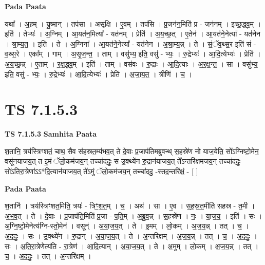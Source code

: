 \documentclass[17pt]{extarticle}
\begin{document}
\textbf{Pada Paata} \newline

यथा᳚ । अ॒हम् । यु॒ष्मान् । तप॑सा । असृ॑क्षि । ए॒वम् । तप॑सि । प्र॒जन॑न॒मिति॑ प्र - जन॑नम् । इ॒च्छ॒द्ध्व॒म् । इति॑ । तेभ्यः॑ । अ॒ग्निम् । आ॒यत॑न॒मित्या᳚ - यत॑नम् । प्रेति॑ । अ॒य॒च्छ॒त् । ए॒तेन॑ । आ॒यत॑ने॒नेत्या᳚ - यत॑नेन । श्रा॒म्य॒त॒ । इति॑ । ते । अ॒ग्निना᳚ । आ॒यत॑ने॒नेत्या᳚ - यत॑नेन । अ॒श्रा॒म्य॒न्न् । ते । सं॒ॅव॒थ्स॒र इति॑ सं - व॒थ्स॒रे । एका᳚म् । गाम् । अ॒सृ॒ज॒न्त॒ । ताम् । वसु॑भ्य॒ इति॒ वसु॑ - भ्यः॒ । रु॒द्रेभ्यः॑ । आ॒दि॒त्येभ्यः॑ । प्रेति॑ । अ॒य॒च्छ॒न्न् । ए॒ताम् । र॒क्ष॒द्ध्व॒म् । इति॑ । ताम् । वस॑वः । रु॒द्राः । आ॒दि॒त्याः । अ॒र॒क्ष॒न्त॒ । सा । वसु॑भ्य॒ इति॒ वसु॑ - भ्यः॒ । रु॒द्रेभ्यः॑ । आ॒दि॒त्येभ्यः॑ । प्रेति॑ । अ॒जा॒य॒त॒ । त्रीणि॑ । च॒ ।  \newline




\section*{ TS 7.1.5.3 }

\textbf{TS 7.1.5.3 } \newline
\textbf{Samhita Paata} \newline

श॒तानि॒ त्रय॑स्त्रिꣳशतं॒ चाथ॒ सैव स॑हस्रत॒म्य॑भव॒त् ते दे॒वाः प्र॒जाप॑तिमब्रुवन्थ् स॒हस्रे॑ण नो याज॒येति॒ सो᳚ऽग्निष्टो॒मेन॒ वसू॑नयाजय॒त् त इ॒मं ॅलो॒कम॑जय॒न् तच्चा॑ददुः॒ स उ॒क्थ्ये॑न रु॒द्रान॑याजय॒त् ते᳚ऽन्तरि॑क्षमजय॒न् तच्चा॑ददुः॒ सो॑ऽतिरा॒त्रेणा॑ऽऽ*दि॒त्यान॑याजय॒त् ते॑ऽमुं ॅलो॒कम॑जय॒न् तच्चा॑ददु॒ -स्तद॒न्तरि॑क्षं॒ - [  ] \newline

\textbf{Pada Paata} \newline

श॒तानि॑ । त्रय॑स्त्रिꣳशत॒मिति॒ त्रयः॑ - त्रिꣳ॒॒श॒त॒म् । च॒ । अथ॑ । सा । ए॒व । स॒ह॒स्र॒त॒मीति॑ सहस्र - त॒मी । अ॒भ॒व॒त् । ते । दे॒वाः । प्र॒जाप॑ति॒मिति॑ प्र॒जा - प॒ति॒म् । अ॒ब्रु॒व॒न्न् । स॒हस्रे॑ण । नः॒ । या॒ज॒य॒ । इति॑ । सः । अ॒ग्नि॒ष्टो॒मेनेत्य॑ग्नि-स्तो॒मेन॑ । वसून्॑ । अ॒या॒ज॒य॒त् । ते । इ॒मम् । लो॒कम् । अ॒ज॒य॒न्न् । तत् । च॒ । अ॒द॒दुः॒ । सः । उ॒क्थ्ये॑न । रु॒द्रान् । अ॒या॒ज॒य॒त् । ते । अ॒न्तरि॑क्षम् । अ॒ज॒य॒न्न् । तत् । च॒ । अ॒द॒दुः॒ । सः । अ॒ति॒रा॒त्रेणेत्य॑ति - रा॒त्रेण॑ । आ॒दि॒त्यान् । अ॒या॒ज॒य॒त् । ते । अ॒मुम् । लो॒कम् । अ॒ज॒य॒न्न् । तत् । च॒ । अ॒द॒दुः॒ । तत् । अ॒न्तरि॑क्षम् ।  \newline
\end{document}
